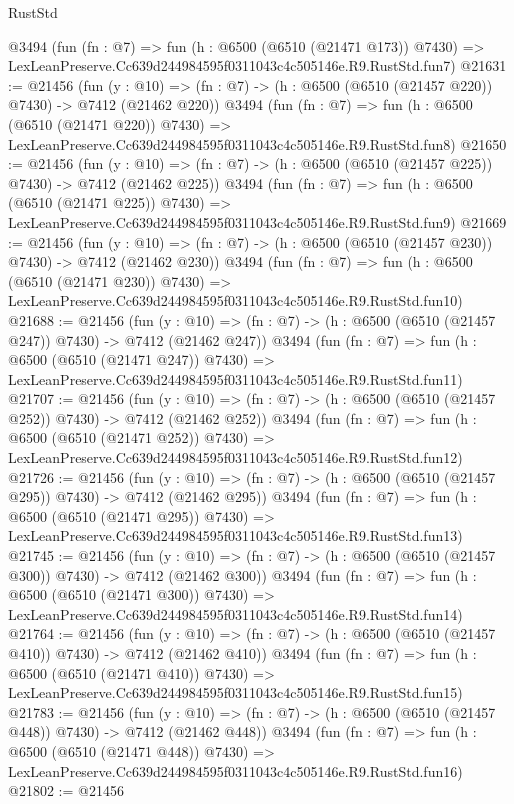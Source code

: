 \begin{lexlean}{RustStd}
\begin{coremodule}
    @3494
    (fun (fn : @7) =>
    fun (h : @6500 (@6510 (@21471 @173)) @7430) =>
    LexLeanPreserve.Cc639d244984595f0311043c4c505146e.R9.RustStd.fun7)
@21631 := @21456
    (fun (y : @10) => (fn : @7) -> (h : @6500 (@6510 (@21457 @220)) @7430) -> @7412 (@21462 @220))
    @3494
    (fun (fn : @7) =>
    fun (h : @6500 (@6510 (@21471 @220)) @7430) =>
    LexLeanPreserve.Cc639d244984595f0311043c4c505146e.R9.RustStd.fun8)
@21650 := @21456
    (fun (y : @10) => (fn : @7) -> (h : @6500 (@6510 (@21457 @225)) @7430) -> @7412 (@21462 @225))
    @3494
    (fun (fn : @7) =>
    fun (h : @6500 (@6510 (@21471 @225)) @7430) =>
    LexLeanPreserve.Cc639d244984595f0311043c4c505146e.R9.RustStd.fun9)
@21669 := @21456
    (fun (y : @10) => (fn : @7) -> (h : @6500 (@6510 (@21457 @230)) @7430) -> @7412 (@21462 @230))
    @3494
    (fun (fn : @7) =>
    fun (h : @6500 (@6510 (@21471 @230)) @7430) =>
    LexLeanPreserve.Cc639d244984595f0311043c4c505146e.R9.RustStd.fun10)
@21688 := @21456
    (fun (y : @10) => (fn : @7) -> (h : @6500 (@6510 (@21457 @247)) @7430) -> @7412 (@21462 @247))
    @3494
    (fun (fn : @7) =>
    fun (h : @6500 (@6510 (@21471 @247)) @7430) =>
    LexLeanPreserve.Cc639d244984595f0311043c4c505146e.R9.RustStd.fun11)
@21707 := @21456
    (fun (y : @10) => (fn : @7) -> (h : @6500 (@6510 (@21457 @252)) @7430) -> @7412 (@21462 @252))
    @3494
    (fun (fn : @7) =>
    fun (h : @6500 (@6510 (@21471 @252)) @7430) =>
    LexLeanPreserve.Cc639d244984595f0311043c4c505146e.R9.RustStd.fun12)
@21726 := @21456
    (fun (y : @10) => (fn : @7) -> (h : @6500 (@6510 (@21457 @295)) @7430) -> @7412 (@21462 @295))
    @3494
    (fun (fn : @7) =>
    fun (h : @6500 (@6510 (@21471 @295)) @7430) =>
    LexLeanPreserve.Cc639d244984595f0311043c4c505146e.R9.RustStd.fun13)
@21745 := @21456
    (fun (y : @10) => (fn : @7) -> (h : @6500 (@6510 (@21457 @300)) @7430) -> @7412 (@21462 @300))
    @3494
    (fun (fn : @7) =>
    fun (h : @6500 (@6510 (@21471 @300)) @7430) =>
    LexLeanPreserve.Cc639d244984595f0311043c4c505146e.R9.RustStd.fun14)
@21764 := @21456
    (fun (y : @10) => (fn : @7) -> (h : @6500 (@6510 (@21457 @410)) @7430) -> @7412 (@21462 @410))
    @3494
    (fun (fn : @7) =>
    fun (h : @6500 (@6510 (@21471 @410)) @7430) =>
    LexLeanPreserve.Cc639d244984595f0311043c4c505146e.R9.RustStd.fun15)
@21783 := @21456
    (fun (y : @10) => (fn : @7) -> (h : @6500 (@6510 (@21457 @448)) @7430) -> @7412 (@21462 @448))
    @3494
    (fun (fn : @7) =>
    fun (h : @6500 (@6510 (@21471 @448)) @7430) =>
    LexLeanPreserve.Cc639d244984595f0311043c4c505146e.R9.RustStd.fun16)
@21802 := @21456

\end{coremodule}
\end{lexlean}
